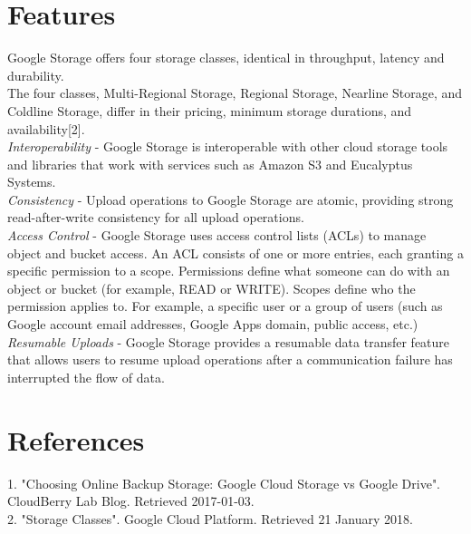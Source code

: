 \documentclass[]{report}
\begin{document}
\section{Features}
Google Storage offers four storage classes, identical in throughput, latency and durability. \\
The four classes, Multi-Regional Storage, Regional Storage, Nearline Storage, and Coldline Storage, differ in their pricing, minimum storage durations, and availability[2].
\\
\textit{Interoperability} - Google Storage is interoperable with other cloud storage tools and libraries that work with services such as Amazon S3 and Eucalyptus Systems.
\\
\textit{Consistency} - Upload operations to Google Storage are atomic, providing strong read-after-write consistency for all upload operations.
\\
\textit{Access Control} - Google Storage uses access control lists (ACLs) to manage object and bucket access. An ACL consists of one or more entries, each granting a specific permission to a scope. Permissions define what someone can do with an object or bucket (for example, READ or WRITE). Scopes define who the permission applies to. For example, a specific user or a group of users (such as Google account email addresses, Google Apps domain, public access, etc.)
\\
\textit{Resumable Uploads} - Google Storage provides a resumable data transfer feature that allows users to resume upload operations after a communication failure has interrupted the flow of data.\\
\section{References}
1. "Choosing Online Backup Storage: Google Cloud Storage vs Google Drive". CloudBerry Lab Blog. Retrieved 2017-01-03.
\\
2. "Storage Classes". Google Cloud Platform. Retrieved 21 January 2018.
\end{document}
